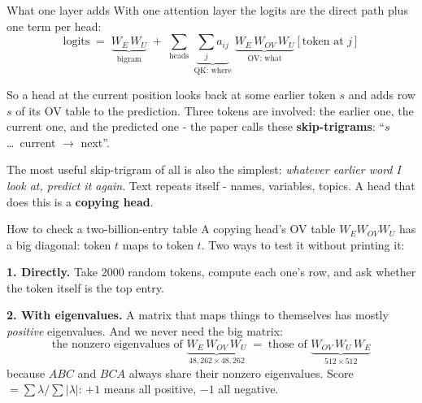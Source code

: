 \documentclass[aspectratio=169]{beamer}
\newcommand{\keybox}[1]{%
  \begin{tcolorbox}[colback=armblue!8, colframe=armblue, boxrule=0.6pt, arc=2pt]
  #1
  \end{tcolorbox}}
\begin{document}
\begin{frame}{What one layer adds}
  \vspace{0.4em}
  With one attention layer the logits are the direct path plus one term per head:
  \[
    \text{logits} \;=\; \underbrace{W_E\,W_U}_{\text{bigram}} \;+\;
    \sum_{\text{heads}}\; \underbrace{\textstyle\sum_j a_{ij}}_{\text{QK: where}}\;
    \underbrace{W_E\,W_{OV}\,W_U}_{\text{OV: what}}[\text{token at } j]
  \]

  \vspace{0.4em}
  So a head at the current position looks back at some earlier token $s$ and adds row $s$ of its
  OV table to the prediction. Three tokens are involved: the earlier one, the current one, and the
  predicted one - the paper calls these \textbf{skip-trigrams}: ``$s$ \ldots\ current
  $\rightarrow$ next''.

  \vspace{0.5em}
  \keybox{\small The most useful skip-trigram of all is also the simplest: \emph{whatever earlier
  word I look at, predict it again}. Text repeats itself - names, variables, topics. A head that
  does this is a \textbf{copying head}.}
\end{frame}

\begin{frame}{How to check a two-billion-entry table}
  \vspace{0.3em}
  A copying head's OV table $W_E W_{OV} W_U$ has a big diagonal: token $t$ maps to token $t$.
  Two ways to test it without printing it:

  \vspace{0.5em}
  \textbf{1. Directly.} Take 2000 random tokens, compute each one's row, and ask whether the
  token itself is the top entry.

  \vspace{0.5em}
  \textbf{2. With eigenvalues.} A matrix that maps things to themselves has mostly
  \emph{positive} eigenvalues. And we never need the big matrix:
  \[
    \text{the nonzero eigenvalues of } \underbrace{W_E\, W_{OV}\, W_U}_{48{,}262 \times 48{,}262}
    \;=\; \text{those of } \underbrace{W_{OV}\, W_U\, W_E}_{512 \times 512}
  \]
  because $ABC$ and $BCA$ always share their nonzero eigenvalues. Score
  $= \sum \lambda / \sum |\lambda|$: $+1$ means all positive, $-1$ all negative.
\end{frame}
\end{document}
